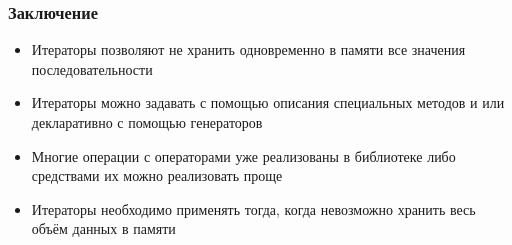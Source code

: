 \documentclass[fleqn, xcolor=x11names]{beamer}
\begin{document}
\begin{frame}[fragile]\frametitle{Заключение}
\begin{itemize}
\item Итераторы позволяют не хранить одновременно в памяти все значения последовательности

\item Итераторы можно задавать с помощью описания специальных методов  и  или декларативно с помощью генераторов

\item Многие операции с операторами уже реализованы в библиотеке  либо средствами  их можно реализовать проще

\item Итераторы необходимо применять тогда, когда невозможно хранить весь объём данных в памяти
\end{itemize}
\end{frame}
\end{document}
